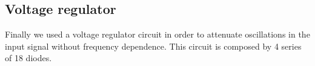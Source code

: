 \subsection{Voltage regulator}
Finally we used a voltage regulator circuit in order to attenuate oscillations in the input signal without frequency dependence. This circuit is composed by 4 series of 18 diodes. 
